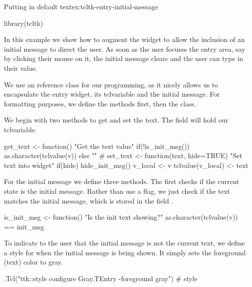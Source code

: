 \begin{example}{Putting in default text}{ex:tcltk-entry-initial-message}
\begin{Schunk}
\begin{Sinput}
 library(tcltk)
\end{Sinput}
\end{Schunk}

In this example we show how to augment the  widget
to allow the inclusion of an initial message to direct the user. As
soon as the user focuses the entry area, say by clicking their mouse
on it, the initial message clears and the user can type in their value.

We use an \R{} reference class for our programming, as it nicely allows us to
encapsulate the entry widget, its tclvariable and the initial
message. For formatting purposes, we define the methods first, then
the class.

We begin with two methods to get and set the text. The field
 will hold our tclvariable.

\begin{Schunk}
\begin{Sinput}
 get_text <- function() {
   "Get the text value"
   if(!is_init_msg())
     as.character(tclvalue(v))
   else
     ""
 }
 #
 set_text <- function(text, hide=TRUE) {
   "Set text into widget"
   if(hide)
     hide_init_msg()
   v_local <- v
   tclvalue(v_local) <- text
 }
\end{Sinput}
\end{Schunk}

For the initial message we define three methods. The first checks if
the current state is the initial message. Rather than use a flag, we
just check if the text matches the initial message, which is stored in
the field .

\begin{Schunk}
\begin{Sinput}
 is_init_msg <- function() {
   "Is the init text showing?"
   as.character(tclvalue(v)) == init_msg
 }
\end{Sinput}
\end{Schunk}
To indicate to the user that the initial message is not the current
text, we define a style for when the initial message is being
shown. It simply sets the foreground (text) color to gray.

\begin{Schunk}
\begin{Sinput}
 .Tcl("ttk::style configure Gray.TEntry -foreground gray") # style
\end{Sinput}
\end{Schunk}


\end{example}
